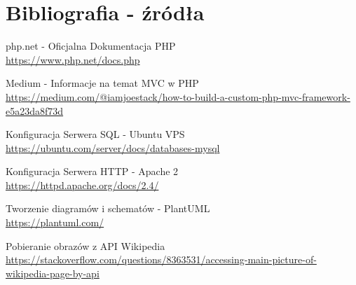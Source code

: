 
\section{Bibliografia - źródła }

\begin{thebibliography}{9}
    php.net - Oficjalna Dokumentacja PHP\\
    \url{https://www.php.net/docs.php}

    Medium - Informacje na temat MVC w PHP\\
    \url{https://medium.com/@iamjoestack/how-to-build-a-custom-php-mvc-framework-e5a23da8f73d}

    Konfiguracja Serwera SQL - Ubuntu VPS\\
    \url{https://ubuntu.com/server/docs/databases-mysql}


    Konfiguracja Serwera HTTP -  Apache 2\\
    \url{https://httpd.apache.org/docs/2.4/}

    Tworzenie diagramów i schematów - PlantUML\\
    \url{https://plantuml.com/}


    Pobieranie obrazów z API Wikipedia\\
    \url{https://stackoverflow.com/questions/8363531/accessing-main-picture-of-wikipedia-page-by-api}


    

    

    
\end{thebibliography}
